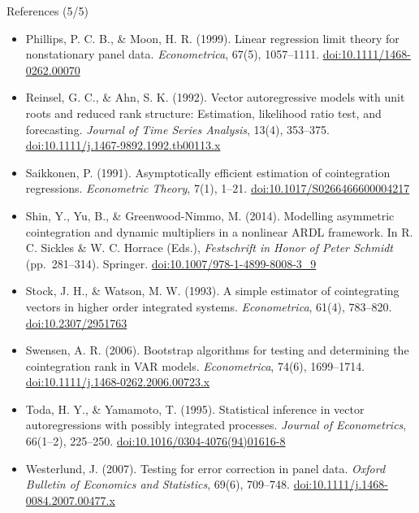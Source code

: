 \begin{frame}{References (5/5)}
\itemsize{\tiny}
\begin{itemize}
    \item Phillips, P. C. B., \& Moon, H. R. (1999). Linear regression limit theory for nonstationary panel data. \textit{Econometrica}, 67(5), 1057--1111. \href{https://doi.org/10.1111/1468-0262.00070}{doi:10.1111/1468-0262.00070}
    \item Reinsel, G. C., \& Ahn, S. K. (1992). Vector autoregressive models with unit roots and reduced rank structure: Estimation, likelihood ratio test, and forecasting. \textit{Journal of Time Series Analysis}, 13(4), 353--375. \href{https://doi.org/10.1111/j.1467-9892.1992.tb00113.x}{doi:10.1111/j.1467-9892.1992.tb00113.x}
    \item Saikkonen, P. (1991). Asymptotically efficient estimation of cointegration regressions. \textit{Econometric Theory}, 7(1), 1--21. \href{https://doi.org/10.1017/S0266466600004217}{doi:10.1017/S0266466600004217}
    \item Shin, Y., Yu, B., \& Greenwood-Nimmo, M. (2014). Modelling asymmetric cointegration and dynamic multipliers in a nonlinear ARDL framework. In R. C. Sickles \& W. C. Horrace (Eds.), \textit{Festschrift in Honor of Peter Schmidt} (pp.\ 281--314). Springer. \href{https://doi.org/10.1007/978-1-4899-8008-3_9}{doi:10.1007/978-1-4899-8008-3\_9}
    \item Stock, J. H., \& Watson, M. W. (1993). A simple estimator of cointegrating vectors in higher order integrated systems. \textit{Econometrica}, 61(4), 783--820. \href{https://doi.org/10.2307/2951763}{doi:10.2307/2951763}
    \item Swensen, A. R. (2006). Bootstrap algorithms for testing and determining the cointegration rank in VAR models. \textit{Econometrica}, 74(6), 1699--1714. \href{https://doi.org/10.1111/j.1468-0262.2006.00723.x}{doi:10.1111/j.1468-0262.2006.00723.x}
    \item Toda, H. Y., \& Yamamoto, T. (1995). Statistical inference in vector autoregressions with possibly integrated processes. \textit{Journal of Econometrics}, 66(1--2), 225--250. \href{https://doi.org/10.1016/0304-4076(94)01616-8}{doi:10.1016/0304-4076(94)01616-8}
    \item Westerlund, J. (2007). Testing for error correction in panel data. \textit{Oxford Bulletin of Economics and Statistics}, 69(6), 709--748. \href{https://doi.org/10.1111/j.1468-0084.2007.00477.x}{doi:10.1111/j.1468-0084.2007.00477.x}
\end{itemize}
\end{frame}


